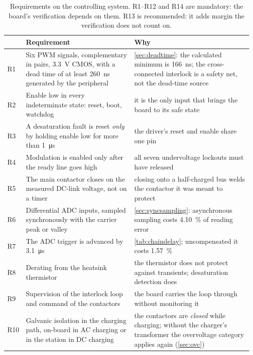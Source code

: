 \begin{table}[htbp]
\centering
\caption{Requirements on the controlling system. R1--R12 and R14 are
mandatory: the board's verification depends on them. R13 is recommended: it
adds margin the verification does not count on.}
\label{tab:sysreq}
\small
\begin{tabularx}{\textwidth}{lYY}
\toprule
 & Requirement & Why \\
\midrule
R1 & Six PWM signals, complementary in pairs, \SI{3.3}{\volt} CMOS, with a
     dead time of at least \SI{260}{\nano\second} generated by the
     peripheral
   & \cref{sec:deadtime}: the calculated minimum is \SI{166}{\nano\second};
     the cross-connected interlock is a safety net, not the dead-time source \\
R2 & Enable low in every indeterminate state: reset, boot, watchdog
   & it is the only input that brings the board to its safe state \\
R3 & A desaturation fault is reset \emph{only} by holding enable low for
     more than \SI{1}{\micro\second}
   & the driver's reset and enable share one pin~\cite{ti_ucc21750} \\
R4 & Modulation is enabled only after the ready line goes high
   & all seven undervoltage lockouts must have released \\
R5 & The main contactor closes on the measured DC-link voltage, not on a
     timer
   & closing onto a half-charged bus welds the contactor it was meant to
     protect \\
R6 & Differential ADC inputs, sampled synchronously with the carrier peak
     or valley
   & \cref{sec:syncsampling}: asynchronous sampling costs
     \SI{4.10}{\percent} of reading error \\
R7 & The ADC trigger is advanced by \SI{3.1}{\micro\second}
   & \cref{tab:chaindelay}; uncompensated it costs \SI{1.57}{\percent} \\
R8 & Derating from the heatsink thermistor
   & the thermistor does not protect against transients; desaturation
     detection does \\
R9 & Supervision of the interlock loop and command of the contactors
   & the board carries the loop through without monitoring it \\
R10 & Galvanic isolation in the charging path, on-board in AC charging or
      in the station in DC charging
   & the contactors are \emph{closed} while charging; without the
     charger's transformer the overvoltage category applies again
     (\cref{sec:ovc}) \\

\end{tabularx}
\end{table}
